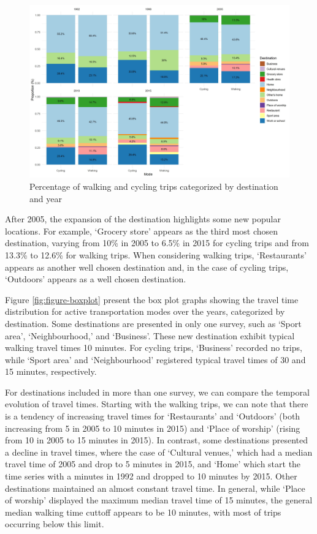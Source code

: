 \documentclass[preprint, 3p,
authoryear]{elsarticle} %
\begin{document}
\begin{figure}
\includegraphics[width=1\linewidth]{figures/destination_percentual} \caption{Percentage of walking and cycling trips categorized by destination and year}\label{fig:figure-destmodeyearperc}
\end{figure}

After 2005, the expansion of the destination highlights some new popular
locations. For example, `Grocery store' appears as the third most chosen
destination, varying from 10\% in 2005 to 6.5\% in 2015 for cycling
trips and from 13.3\% to 12.6\% for walking trips. When considering
walking trips, `Restaurants' appears as another well chosen destination
and, in the case of cycling trips, `Outdoors' appears as a well chosen
destination.

Figure \ref{fig:figure-boxplot} present the box plot graphs showing the
travel time distribution for active transportation modes over the years,
categorized by destination. Some destinations are presented in only one
survey, such as `Sport area', `Neighbourhood,' and `Business'. These new
destination exhibit typical walking travel times 10 minutes. For cycling
trips, `Business' recorded no trips, while `Sport area' and
`Neighbourhood' registered typical travel times of 30 and 15 minutes,
respectively.

For destinations included in more than one survey, we can compare the
temporal evolution of travel times. Starting with the walking trips, we
can note that there is a tendency of increasing travel times for
`Restaurants' and `Outdoors' (both increasing from 5 in 2005 to 10
minutes in 2015) and `Place of worship' (rising from 10 in 2005 to 15
minutes in 2015). In contrast, some destinations presented a decline in
travel times, where the case of `Cultural venues,' which had a median
travel time of 2005 and drop to 5 minutes in 2015, and `Home' which
start the time series with a minutes in 1992 and dropped to 10 minutes
by 2015. Other destinations maintained an almost constant travel time.
In general, while `Place of worship' displayed the maximum median travel
time of 15 minutes, the general median walking time cuttoff appears to
be 10 minutes, with most of trips occurring below this limit.
\end{document}
